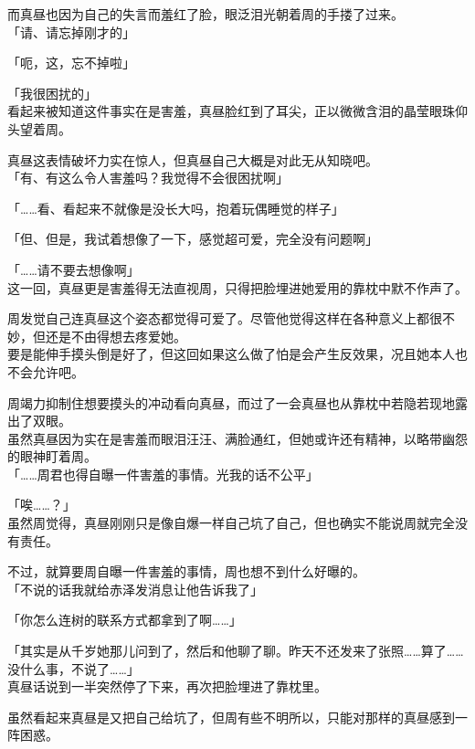 而真昼也因为自己的失言而羞红了脸，眼泛泪光朝着周的手搂了过来。\\

「请、请忘掉刚才的」

「呃，这，忘不掉啦」

「我很困扰的」\\

看起来被知道这件事实在是害羞，真昼脸红到了耳尖，正以微微含泪的晶莹眼珠仰头望着周。

真昼这表情破坏力实在惊人，但真昼自己大概是对此无从知晓吧。\\

「有、有这么令人害羞吗？我觉得不会很困扰啊」

「……看、看起来不就像是没长大吗，抱着玩偶睡觉的样子」

「但、但是，我试着想像了一下，感觉超可爱，完全没有问题啊」

「……请不要去想像啊」\\

这一回，真昼更是害羞得无法直视周，只得把脸埋进她爱用的靠枕中默不作声了。

周发觉自己连真昼这个姿态都觉得可爱了。尽管他觉得这样在各种意义上都很不妙，但还是不由得想去疼爱她。\\

要是能伸手摸头倒是好了，但这回如果这么做了怕是会产生反效果，况且她本人也不会允许吧。

周竭力抑制住想要摸头的冲动看向真昼，而过了一会真昼也从靠枕中若隐若现地露出了双眼。\\

虽然真昼因为实在是害羞而眼泪汪汪、满脸通红，但她或许还有精神，以略带幽怨的眼神盯着周。\\

「……周君也得自曝一件害羞的事情。光我的话不公平」

「唉……？」\\

虽然周觉得，真昼刚刚只是像自爆一样自己坑了自己，但也确实不能说周就完全没有责任。

不过，就算要周自曝一件害羞的事情，周也想不到什么好曝的。\\

「不说的话我就给赤泽发消息让他告诉我了」

「你怎么连树的联系方式都拿到了啊……」

「其实是从千岁她那儿问到了，然后和他聊了聊。昨天不还发来了张照……算了……没什么事，不说了……」\\

真昼话说到一半突然停了下来，再次把脸埋进了靠枕里。

虽然看起来真昼是又把自己给坑了，但周有些不明所以，只能对那样的真昼感到一阵困惑。

